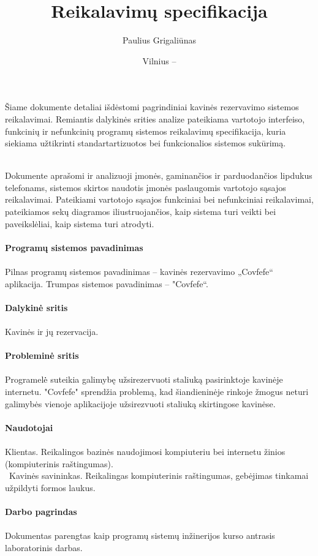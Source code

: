 \documentclass{VUMIFPSkursinis}
\title{Reikalavimų specifikacija}
\author{Paulius Grigaliūnas}
\date{Vilnius – \the\year}
\begin{document}
\maketitle
\cleardoublepage{}
\setcounter{page}{2}



\noindent
Šiame dokumente detaliai išdėstomi pagrindiniai kavinės rezervavimo sistemos reikalavimai. Remiantis dalykinės srities analize pateikiama vartotojo interfeiso, funkcinių ir nefunkcinių programų sistemos reikalavimų specifikacija, kuria siekiama užtikrinti standartartizuotos bei funkcionalios sistemos sukūrimą.\\\\




\tableofcontents


Dokumente aprašomi ir analizuoji įmonės, gaminančios ir parduodančios lipdukus telefonams, sistemos skirtos naudotis įmonės paslaugomis vartotojo sąsajos reikalavimai. Pateikiami vartotojo sąsajos funkciniai bei nefunkciniai reikalavimai, pateikiamos sekų diagramos iliustruojančios, kaip sistema turi veikti bei paveikslėliai, kaip sistema turi atrodyti.\\\\
{\bfseries Programų sistemos pavadinimas}\\\\
Pilnas programų sistemos pavadinimas – kavinės rezervavimo „Covfefe“ aplikacija. Trumpas sistemos pavadinimas – "Covfefe“.\\\\
{\bfseries Dalykinė sritis}\\\\
Kavinės ir jų rezervacija.\\\\
\noindent
{\bfseries Probleminė sritis}\\\\
Programelė̇ suteikia galimybę užsirezervuoti staliuką pasirinktoje kavinėje internetu. "Covfefe" sprendžia problemą, kad šiandieninėje rinkoje žmogus neturi galimybės vienoje aplikacijoje užsirezvuoti staliuką skirtingose kavinėse.\\\\
{\bfseries Naudotojai}\\\\
Klientas. Reikalingos bazinės naudojimosi kompiuteriu bei internetu žinios (kompiuterinis raštingumas).\\\
Kavinės savininkas. Reikalingas kompiuterinis raštingumas, gebėjimas tinkamai užpildyti formos laukus.\\\\
{\bfseries Darbo pagrindas}\\\\
Dokumentas parengtas kaip programų sistemų inžinerijos kurso antrasis laboratorinis darbas.
\end{document}

